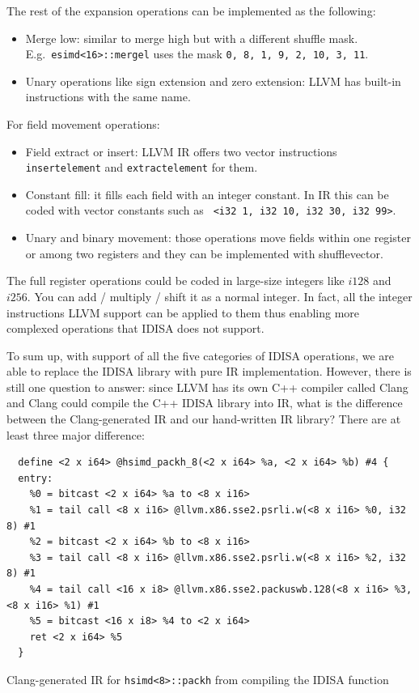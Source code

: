 The rest of the expansion operations can be implemented as the following:
\begin{itemize}
    \item Merge low: similar to merge high but with a different shuffle mask. E.g.\ {\tt esimd<16>::mergel} uses the mask {\tt 0, 8, 1, 9, 2, 10, 3, 11}.
    \item Unary operations like sign extension and zero extension: LLVM has built-in instructions with the same name.
\end{itemize}

For field movement operations:
\begin{itemize}
    \item Field extract or insert: LLVM IR offers two vector instructions {\tt insertelement} and {\tt extractelement} for them.
    \item Constant fill: it fills each field with an integer constant. In IR this can be coded with vector constants such as {\tt <4 x i32> <i32 1, i32 10, i32 30, i32 99>}.
    \item Unary and binary movement: those operations move fields within one register or among two registers and they can be implemented with shufflevector.
\end{itemize}

The full register operations could be coded in large-size integers like $i128$ and $i256$. You can add / multiply / shift it as a normal integer. In fact, all the integer instructions LLVM support can be applied to them thus enabling more complexed operations that IDISA does not support.

To sum up, with support of all the five categories of IDISA operations, we are able to replace the IDISA library with pure IR implementation. However, there is still one question to answer: since LLVM has its own C++ compiler called Clang and Clang could compile the C++ IDISA library into IR, what is the difference between the Clang-generated IR and our hand-written IR library? There are at least three major difference:

\begin{program}
\begin{verbatim}
  define <2 x i64> @hsimd_packh_8(<2 x i64> %a, <2 x i64> %b) #4 {
  entry:
    %0 = bitcast <2 x i64> %a to <8 x i16>
    %1 = tail call <8 x i16> @llvm.x86.sse2.psrli.w(<8 x i16> %0, i32 8) #1
    %2 = bitcast <2 x i64> %b to <8 x i16>
    %3 = tail call <8 x i16> @llvm.x86.sse2.psrli.w(<8 x i16> %2, i32 8) #1
    %4 = tail call <16 x i8> @llvm.x86.sse2.packuswb.128(<8 x i16> %3, <8 x i16> %1) #1
    %5 = bitcast <16 x i8> %4 to <2 x i64>
    ret <2 x i64> %5
  }
\end{verbatim}
\caption{Clang-generated IR for {\tt hsimd<8>::packh} from compiling the IDISA function}
\label{prog:packh_8_sse2_llvm}
\end{program}

